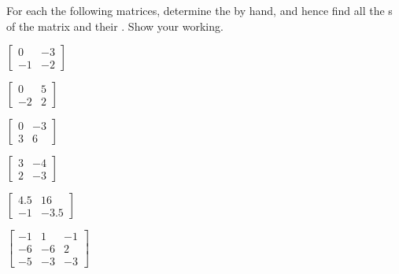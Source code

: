 \begin{exercise}  
For each the following matrices, determine the  by hand, and hence find all the s of the matrix and their .
Show your working.

\begin{Parts}
\item \(\begin{bmatrix} 0 & -3
\\-1 & -2 \end{bmatrix}\)

\item \(\begin{bmatrix} 0 & 5
\\-2 & 2 \end{bmatrix}\)

\begin{OmitV1}
\item \(\begin{bmatrix} 0 & -3
\\3 & 6 \end{bmatrix}\)

\item \(\begin{bmatrix} 3 & -4
\\2 & -3 \end{bmatrix}\)
\end{OmitV1}

\item \(\begin{bmatrix} 4.5 & 16
\\-1 & -3.5 \end{bmatrix}\)

\item \(\begin{bmatrix} -1 & 1 & -1
\\-6 & -6 & 2
\\-5 & -3 & -3 \end{bmatrix}\)


\end{Parts}
\end{exercise}

